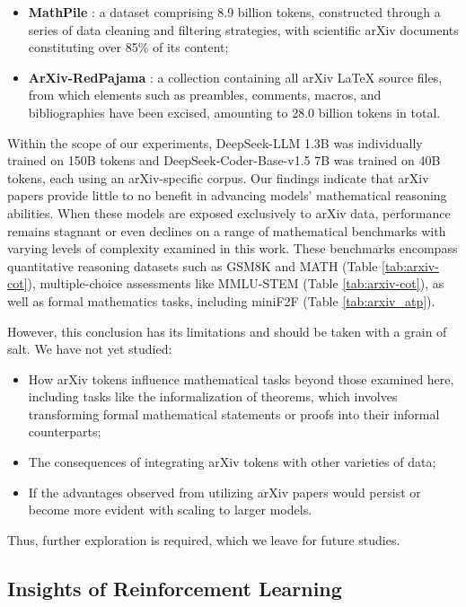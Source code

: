 \begin{itemize}[topsep=0pt]
\begin{itemize}[topsep=0pt]
    \item \textbf{MathPile} \citep{mathpile}: a dataset comprising 8.9 billion tokens, constructed through a series of data cleaning and filtering strategies, with scientific arXiv documents constituting over 85\% of its content;
    \item \textbf{ArXiv-RedPajama} \citep{redpajama}: a collection containing all arXiv LaTeX source files, from which elements such as preambles, comments, macros, and bibliographies have been excised, amounting to 28.0 billion tokens in total.
\end{itemize}

Within the scope of our experiments, DeepSeek-LLM 1.3B was individually trained on 150B tokens and DeepSeek-Coder-Base-v1.5 7B was trained on 40B tokens, each using an arXiv-specific corpus. Our findings indicate that arXiv papers provide little to no benefit in advancing models' mathematical reasoning abilities. When these models are exposed exclusively to arXiv data, performance remains stagnant or even declines on a range of mathematical benchmarks with varying levels of complexity examined in this work. These benchmarks encompass quantitative reasoning datasets such as GSM8K and MATH (Table \ref{tab:arxiv-cot}), multiple-choice assessments like MMLU-STEM (Table \ref{tab:arxiv-cot}), as well as formal mathematics tasks, including miniF2F (Table \ref{tab:arxiv_atp}).

However, this conclusion has its limitations and should be taken with a grain of salt. We have not yet studied:

\begin{itemize}[topsep=0pt]
    \item How arXiv tokens influence mathematical tasks beyond those examined here, including tasks like the informalization of theorems, which involves transforming formal mathematical statements or proofs into their informal counterparts;
    \item The consequences of integrating arXiv tokens with other varieties of data;
    \item If the advantages observed from utilizing arXiv papers would persist or become more evident with scaling to larger models.
\end{itemize}

Thus, further exploration is required, which we leave for future studies.

\subsection{Insights of Reinforcement Learning}

\end{itemize}
